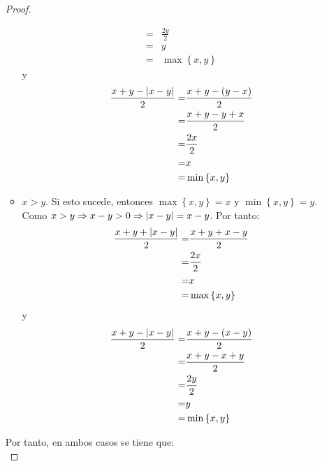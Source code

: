 \documentclass[12pt]{article}
\begin{document}
\begin{enumerate}
\begin{proof}
\begin{itemize}
\begin{equation*}
\begin{split}
                    =&\frac{2y}{2}\\
                    =&y\\
                    =&\max\left\{x,y\right\}
                \end{split}
            \end{equation*}
            y
            \begin{equation*}
                \begin{split}
                    \frac{x+y-\left| x-y \right|}{2}=&\frac{x+y-(y-x)}{2}\\
                    =&\frac{x+y-y+x}{2}\\
                    =&\frac{2x}{2}\\
                    =&x\\
                    =&\min\left\{x,y\right\}
                \end{split}
            \end{equation*}
            \item $x>y$. Si esto sucede, entonces $\max\left\{x,y\right\}=x$ y $\min\left\{x,y\right\}=y$. Como $x>y\Rightarrow x-y>0\Rightarrow\left| x-y \right|=x-y$. Por tanto:
            \begin{equation*}
                \begin{split}
                    \frac{x+y+\left| x-y \right|}{2}=&\frac{x+y+x-y}{2}\\
                    =&\frac{2x}{2}\\
                    =&x\\
                    =&\max\left\{x,y\right\}
                \end{split}
            \end{equation*}
            y
            \begin{equation*}
                \begin{split}
                    \frac{x+y-\left| x-y \right|}{2}=&\frac{x+y-(x-y)}{2}\\
                    =&\frac{x+y-x+y}{2}\\
                    =&\frac{2y}{2}\\
                    =&y\\
                    =&\min\left\{x,y\right\}
                \end{split}
            \end{equation*}
        \end{itemize}
        Por tanto, en ambos casos se tiene que:
        \begin{equation*}

\end{equation*}
\end{proof}
\end{enumerate}
\end{document}
